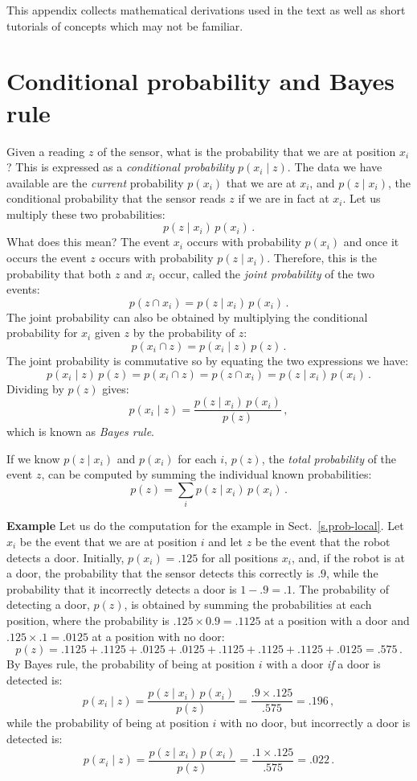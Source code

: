 This appendix collects mathematical derivations used in the text as well as short tutorials of concepts which may not be familiar.

\section{Conditional probability and Bayes rule}\label{a.bayes}

Given a reading $z$ of the sensor, what is the probability that we are at position $x_i$? This is expressed as a \emph{conditional probability} $p(x_i\mid z)$. The data we have available are the \emph{current} probability $p(x_i)$ that we are at $x_i$, and $p(z\mid x_i)$, the conditional probability that the sensor reads $z$ if we are in fact at $x_i$. Let us multiply these two probabilities:
\[
p(z\mid x_i)\, p(x_i)\,.
\]
What does this mean? The event $x_i$ occurs with probability $p(x_i)$ and once it occurs the event $z$ occurs with probability $p(z\mid x_i)$. Therefore, this is the probability that both $z$ and $x_i$ occur, called the \emph{joint	probability} of the two events:
\[
p(z \cap x_i) = p(z\mid x_i)\, p(x_i)\,.
\]
The joint probability can also be obtained by multiplying the conditional probability for $x_i$ given $z$ by the probability of $z$:
\[
p(x_i \cap z) = p(x_i\mid z)\, p(z)\,.
\]
The joint probability is commutative so by equating the two expressions we have:
\[
p(x_i\mid z)\, p(z) = p(x_i \cap z) = p(z \cap x_i) = p(z\mid x_i)\, p(x_i)\,.
\]
Dividing by $p(z)$ gives:
\[
p(x_i\mid z)= \frac{p(z\mid x_i)\, p(x_i)}{p(z)}\,,
\]
which is known as \emph{Bayes rule}.

If we know $p(z\mid x_i)$ and $p(x_i)$ for each $i$, $p(z)$, the \emph{total probability} of the event $z$, can be computed by summing the individual known probabilities:
\begin{displaymath}
p(z) = \sum_i p(z\mid x_i)\, p(x_i)\,.
\end{displaymath}

\noindent\textbf{Example} Let us do the computation for the example in Sect.~\ref{s.prob-local}. Let $x_i$ be the event that we are at position $i$ and let $z$ be the event that the robot detects a door. Initially, $p(x_i)=.125$ for all positions $x_i$, and, if the robot is at a door, the probability that the sensor detects this correctly is $.9$, while the probability that it incorrectly detects a door is $1-.9=.1$. The probability of detecting a door, $p(z)$, is obtained by summing the probabilities at each position, where the probability is $.125\times 0.9 = .1125$ at a position with a door and $.125\times .1= .0125$ at a position with no door:
\[
p(z)=.1125 + .1125 + .0125 + .0125 + .1125 + .1125 + .1125 + .0125 = .575\,.
\]
By Bayes rule, the probability of being at position $i$ with a door \emph{if} a door is detected is:
\[
p(x_i \mid z) = \frac{p(z\mid x_i)\, p(x_i)}{p(z)}=\frac{.9\times .125}{.575} = .196\,,
\]
while the probability of being at position $i$ with no door, but incorrectly a door is detected is:
\[
p(x_i \mid z) = \frac{p(z\mid x_i)\, p(x_i)}{p(z)}=\frac{.1\times .125}{.575} = .022\,.
\]

